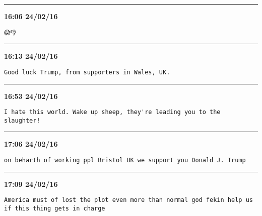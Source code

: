 \hrule%

\begin{adjustwidth}{0cm}{0cm}
\footnotesize \textbf{16:06 24/02/16}

\begin{lstlisting}[breaklines, breakatwhitespace, basicstyle=\small, frame=leftline]
😱👎
\end{lstlisting}
\end{adjustwidth}

\hrule%

\begin{adjustwidth}{0cm}{0cm}
\footnotesize \textbf{16:13 24/02/16}

\begin{lstlisting}[breaklines, breakatwhitespace, basicstyle=\small, frame=leftline]
Good luck Trump, from supporters in Wales, UK.
\end{lstlisting}
\end{adjustwidth}

\hrule%

\begin{adjustwidth}{0cm}{0cm}
\footnotesize \textbf{16:53 24/02/16}

\begin{lstlisting}[breaklines, breakatwhitespace, basicstyle=\small, frame=leftline]
I hate this world. Wake up sheep, they're leading you to the slaughter!
\end{lstlisting}
\end{adjustwidth}

\hrule%

\begin{adjustwidth}{0cm}{0cm}
\footnotesize \textbf{17:06 24/02/16}

\begin{lstlisting}[breaklines, breakatwhitespace, basicstyle=\small, frame=leftline]
on beharth of working ppl Bristol UK we support you Donald J. Trump
\end{lstlisting}
\end{adjustwidth}

\hrule%

\begin{adjustwidth}{0cm}{0cm}
\footnotesize \textbf{17:09 24/02/16}

\begin{lstlisting}[breaklines, breakatwhitespace, basicstyle=\small, frame=leftline]
America must of lost the plot even more than normal god fekin help us if this thing gets in charge
\end{lstlisting}
\end{adjustwidth}

